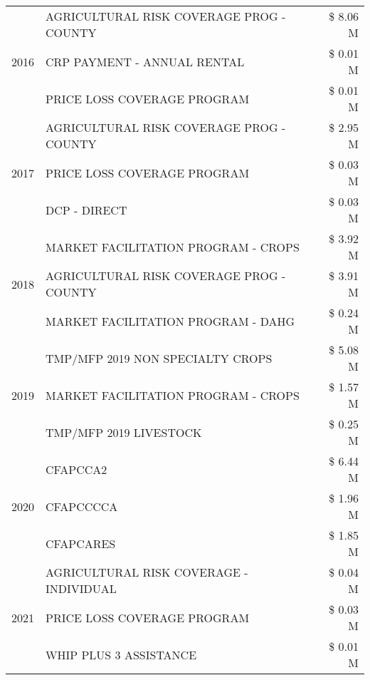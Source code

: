 \begin{tabular}{llr}
\cline{1-3}
\multirow[t]{3}{*}{2016} & AGRICULTURAL RISK COVERAGE PROG - COUNTY      & \$ 8.06 M \\
 & CRP PAYMENT - ANNUAL RENTAL                   & \$ 0.01 M \\
 & PRICE LOSS COVERAGE PROGRAM                   & \$ 0.01 M \\
\cline{1-3}
\multirow[t]{3}{*}{2017} & AGRICULTURAL RISK COVERAGE PROG - COUNTY & \$ 2.95 M \\
 & PRICE LOSS COVERAGE PROGRAM & \$ 0.03 M \\
 & DCP - DIRECT & \$ 0.03 M \\
\cline{1-3}
\multirow[t]{3}{*}{2018} & MARKET FACILITATION PROGRAM - CROPS & \$ 3.92 M \\
 & AGRICULTURAL RISK COVERAGE PROG - COUNTY & \$ 3.91 M \\
 & MARKET FACILITATION PROGRAM - DAHG & \$ 0.24 M \\
\cline{1-3}
\multirow[t]{3}{*}{2019} & TMP/MFP 2019 NON SPECIALTY CROPS & \$ 5.08 M \\
 & MARKET FACILITATION PROGRAM - CROPS & \$ 1.57 M \\
 & TMP/MFP 2019 LIVESTOCK & \$ 0.25 M \\
\cline{1-3}
\multirow[t]{3}{*}{2020} & CFAPCCA2 & \$ 6.44 M \\
 & CFAPCCCCA & \$ 1.96 M \\
 & CFAPCARES & \$ 1.85 M \\
\cline{1-3}
\multirow[t]{3}{*}{2021} & AGRICULTURAL RISK COVERAGE - INDIVIDUAL & \$ 0.04 M \\
 & PRICE LOSS COVERAGE PROGRAM & \$ 0.03 M \\
 & WHIP PLUS 3 ASSISTANCE & \$ 0.01 M \\
\cline{1-3}
\bottomrule
\end{tabular}
